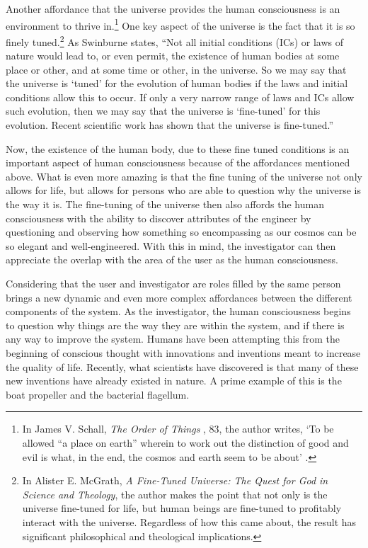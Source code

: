 Another affordance that the universe provides the human consciousness is
an environment to thrive in.\footnote{
In James V. Schall, \textit{The Order of Things
}, 83, the author writes, ‘To be
allowed “a place on earth” wherein to work out the distinction of good
and evil is what, in the end, the cosmos and earth seem to be about’ \citep[][pg. 83]{schall2007}.
} One key aspect of the
universe is the fact that it is so finely tuned.\footnote{
In Alister E. McGrath, \textit{A Fine-Tuned
Universe: The Quest for God in Science and Theology}, the author makes the point that not
only is the universe fine-tuned for life, but human beings are
fine-tuned to profitably interact with the universe. Regardless of how
this came about, the result has significant philosophical and
theological implications.\citep{mcgrath2009}
} As
Swinburne states, ``Not all initial conditions (ICs) or laws of nature
would lead to, or even permit, the existence of human bodies at some
place or other, and at some time or other, in the universe. So we may
say that the universe is `tuned' for the evolution of human bodies if
the laws and initial conditions allow this to occur. If only a very
narrow range of laws and ICs allow such evolution, then we may say that
the universe is `fine-tuned' for this evolution. Recent scientific work
has shown that the universe is fine-tuned.''

Now, the existence of the human body, due to these fine tuned conditions
is an important aspect of human consciousness because of the
affordances mentioned above. What is even more amazing is that the fine
tuning of the universe not only allows for life, but allows for persons
who are able to question why the universe is the way it is. The
fine-tuning of the universe then also affords the human consciousness
with the ability to discover attributes of the engineer by questioning
and observing how something so encompassing as our cosmos can be so
elegant and well-engineered. With this in mind, the investigator can
then appreciate the overlap with the area of the user as the human
consciousness.

Considering that the user and investigator are roles filled by the same
person brings a new dynamic and even more complex affordances between
the different components of the system. As the investigator, the human
consciousness begins to question why things are the way they are within
the system, and if there is any way to improve the system. Humans have
been attempting this from the beginning of conscious thought with
innovations and inventions meant to increase the quality of life.
Recently, what scientists have discovered is that many of these new
inventions have already existed in nature. A prime example of this is
the boat propeller and the bacterial flagellum. 

